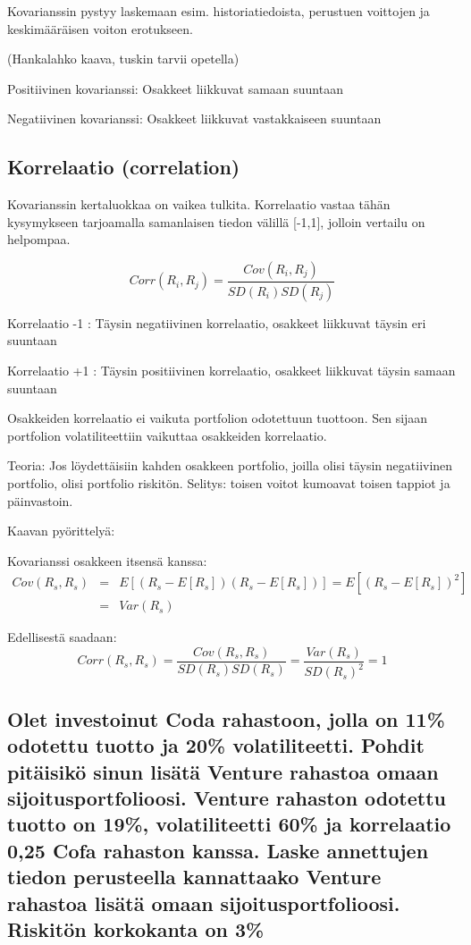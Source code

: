 \documentclass[a4paper]{article}
\begin{document}
Kovarianssin pystyy laskemaan esim. historiatiedoista, perustuen voittojen ja keskimääräisen voiton erotukseen.

(Hankalahko kaava, tuskin tarvii opetella)

Positiivinen kovarianssi: Osakkeet liikkuvat samaan suuntaan

Negatiivinen kovarianssi: Osakkeet liikkuvat vastakkaiseen suuntaan

\subsection{Korrelaatio (correlation)}

Kovarianssin kertaluokkaa on vaikea tulkita. Korrelaatio vastaa tähän kysymykseen tarjoamalla samanlaisen tiedon välillä [-1,1], jolloin vertailu on helpompaa.

\[
    Corr(R_i, R_j) = \frac{Cov(R_i, R_j)}{SD(R_i) SD(R_j)}
\]

Korrelaatio -1 : Täysin negatiivinen korrelaatio, osakkeet liikkuvat täysin eri suuntaan

Korrelaatio +1 : Täysin positiivinen korrelaatio, osakkeet liikkuvat täysin samaan suuntaan

Osakkeiden korrelaatio ei vaikuta portfolion odotettuun tuottoon. Sen sijaan portfolion volatiliteettiin vaikuttaa osakkeiden korrelaatio.

Teoria: Jos löydettäisiin kahden osakkeen portfolio, joilla olisi täysin negatiivinen portfolio, olisi portfolio riskitön. Selitys: toisen voitot kumoavat toisen tappiot ja päinvastoin.

Kaavan pyörittelyä:

Kovarianssi osakkeen itsensä kanssa:
\[
\begin{array}{lcl}
Cov(R_s, R_s) & = & E[(R_s - E[R_s])(R_s - E[R_s])] = E[(R_s - E[R_s])^2] \\
 & = & Var(R_s)
\end{array}
\]

Edellisestä saadaan:
\[
Corr(R_s, R_s) = \frac{Cov(R_s, R_s)}{SD(R_s) SD(R_s)} = \frac{Var(R_s)}{SD(R_s)^2} = 1
\]

\subsection{Olet investoinut Coda rahastoon, jolla on 11\% odotettu tuotto ja 20\% volatiliteetti. Pohdit pitäisikö sinun lisätä Venture rahastoa omaan sijoitusportfolioosi. Venture rahaston odotettu tuotto on 19\%, volatiliteetti 60\% ja korrelaatio 0,25 Cofa rahaston kanssa. Laske annettujen tiedon perusteella kannattaako Venture rahastoa lisätä omaan sijoitusportfolioosi. Riskitön korkokanta on 3\%}
\end{document}
